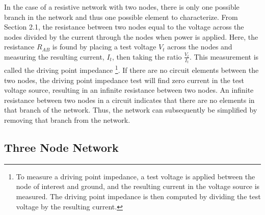 \documentclass[11pt,twoside]{mitthesis}
\begin{document}
In the case of a resistive network with two nodes, there is only one possible branch in the network and thus one possible element to characterize.
From Section 2.1, the resistance between two nodes equal to the voltage across the nodes divided by the current through the nodes when power is applied.  
Here, the resistance $R_{AB}$ is found by placing a test voltage $V_t$ across the nodes and measuring the resulting current, $I_t$, then taking the ratio $\frac{V_t}{I_t}$.
This measurement is called the driving point impedance \footnote{To measure a driving point impedance, a test voltage is applied between the node of interest and ground, and the resulting current in the voltage source is measured. 
The driving point impedance is then computed by dividing the test voltage by the resulting current.}.
If there are no circuit elements between the two nodes, the driving point impedance test will find zero current in the test voltage source, resulting in an infinite resistance between two nodes.
An infinite resistance between two nodes in a circuit indicates that there are no elements in that branch of the network.
Thus, the network can subsequently be simplified by removing that branch from the network.


\subsection{Three Node Network}
\end{document}
